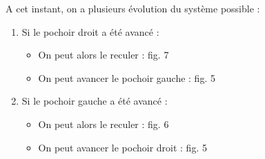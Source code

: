 A cet instant, on a plusieurs évolution du système possible : 
\begin{enumerate}
  \item Si le pochoir droit a été avancé : \\
    \begin{itemize}
      \item On peut alors le reculer : fig. 7
      \item On peut avancer le pochoir gauche : fig. 5
    \end{itemize}
  \item Si le pochoir gauche a été avancé : \\
    \begin{itemize}
      \item On peut alors le reculer : fig. 6
      \item On peut avancer le pochoir droit : fig. 5
    \end{itemize}
\end{enumerate}

